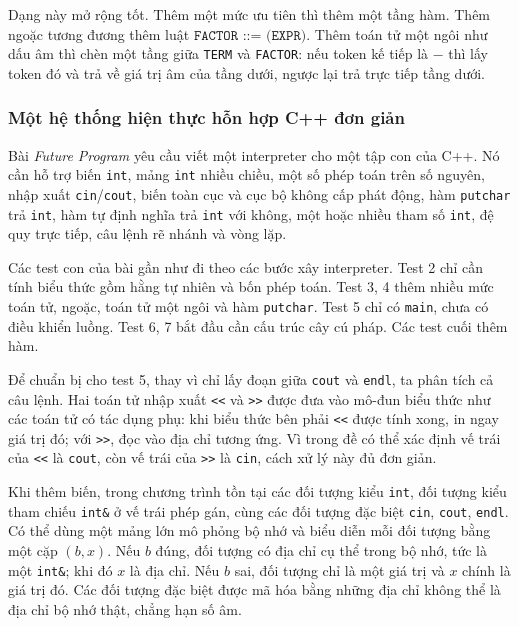 \documentclass[11pt]{article}
\begin{document}
Dạng này mở rộng tốt. Thêm một mức ưu tiên thì thêm một tầng hàm. Thêm ngoặc
tương đương thêm luật \(\texttt{FACTOR ::= (EXPR)}\). Thêm toán tử một ngôi
như dấu âm thì chèn một tầng giữa \texttt{TERM} và \texttt{FACTOR}: nếu token kế
tiếp là \(-\) thì lấy token đó và trả về giá trị âm của tầng dưới, ngược lại
trả trực tiếp tầng dưới.

\subsubsection{Một hệ thống hiện thực hỗn hợp C++ đơn giản}

Bài \emph{Future Program} yêu cầu viết một interpreter cho một tập con của C++.
Nó cần hỗ trợ biến \texttt{int}, mảng \texttt{int} nhiều chiều, một số phép toán
trên số nguyên, nhập xuất \texttt{cin}/\texttt{cout}, biến toàn cục và cục bộ
không cấp phát động, hàm \texttt{putchar} trả \texttt{int}, hàm tự định nghĩa
trả \texttt{int} với không, một hoặc nhiều tham số \texttt{int}, đệ quy trực
tiếp, câu lệnh rẽ nhánh và vòng lặp.

Các test con của bài gần như đi theo các bước xây interpreter. Test 2 chỉ cần
tính biểu thức gồm hằng tự nhiên và bốn phép toán. Test 3, 4 thêm nhiều mức
toán tử, ngoặc, toán tử một ngôi và hàm \texttt{putchar}. Test 5 chỉ có
\texttt{main}, chưa có điều khiển luồng. Test 6, 7 bắt đầu cần cấu trúc cây cú
pháp. Các test cuối thêm hàm.

Để chuẩn bị cho test 5, thay vì chỉ lấy đoạn giữa \texttt{cout} và
\texttt{endl}, ta phân tích cả câu lệnh. Hai toán tử nhập xuất \texttt{<<} và
\texttt{>>} được đưa vào mô-đun biểu thức như các toán tử có tác dụng phụ: khi
biểu thức bên phải \texttt{<<} được tính xong, in ngay giá trị đó; với
\texttt{>>}, đọc vào địa chỉ tương ứng. Vì trong đề có thể xác định vế trái của
\texttt{<<} là \texttt{cout}, còn vế trái của \texttt{>>} là \texttt{cin}, cách
xử lý này đủ đơn giản.

Khi thêm biến, trong chương trình tồn tại các đối tượng kiểu \texttt{int}, đối
tượng kiểu tham chiếu \texttt{int\&} ở vế trái phép gán, cùng các đối tượng đặc
biệt \texttt{cin}, \texttt{cout}, \texttt{endl}. Có thể dùng một mảng lớn mô
phỏng bộ nhớ và biểu diễn mỗi đối tượng bằng một cặp \((b,x)\). Nếu \(b\) đúng,
đối tượng có địa chỉ cụ thể trong bộ nhớ, tức là một \texttt{int\&}; khi đó
\(x\) là địa chỉ. Nếu \(b\) sai, đối tượng chỉ là một giá trị và \(x\) chính là
giá trị đó. Các đối tượng đặc biệt được mã hóa bằng những địa chỉ không thể là
địa chỉ bộ nhớ thật, chẳng hạn số âm.
\end{document}
